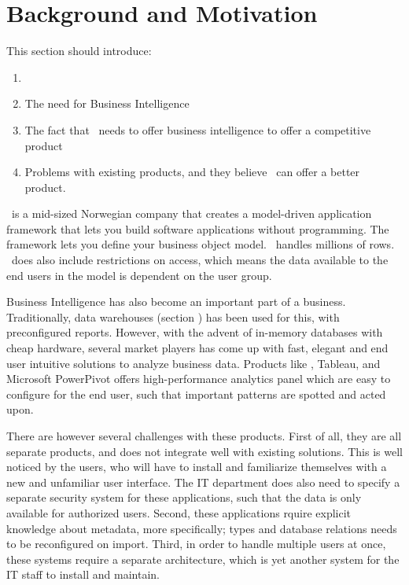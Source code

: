 \section{Background and Motivation}
\label{sec:background-and-motivation}
\begin{secex}
    This section should introduce:
    \begin{enumerate}
      \item \genus
      \item The need for Business Intelligence
      \item The fact that \genus~needs to offer business intelligence to offer a competitive product
      \item Problems with existing products, and they believe \genus~can offer a better product.
    \end{enumerate}
\end{secex}

\genus~is a mid-sized Norwegian company that creates a model-driven application framework that lets you build software applications without programming. The framework lets you define your business object model. \genusSoftware~handles millions of rows. \genusSoftware~does also include restrictions on access, which means the data available to the end users in the model is dependent on the user group. 

Business Intelligence has also become an important part of a business. Traditionally, data warehouses (section ) has been used for this, with preconfigured reports. However, with the advent of in-memory databases with cheap hardware, several market players has come up with fast, elegant and end user intuitive solutions to analyze business data. Products like \qlikview, Tableau, and Microsoft PowerPivot offers high-performance analytics panel which are easy to configure for the end user, such that important patterns are spotted and acted upon. 

There are however several challenges with these products. First of all, they are all separate products, and does not integrate well with existing solutions. This is well noticed by the users, who will have to install and familiarize themselves with a new and unfamiliar user interface. The IT department does also need to specify a separate security system for these applications, such that the data is only available for authorized users. Second, these applications rquire explicit knowledge about metadata, more specifically; types and database relations needs to be reconfigured on import. Third, in order to handle multiple users at once, these systems require a separate architecture, which is yet another system for the IT staff to install and maintain.

